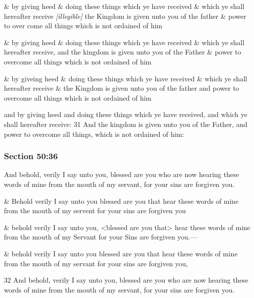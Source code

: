 		\begin{framed}
		\scriptsize
			\begin{compactdesc}
				\item[JSP] \& by giving heed \& doing these things which ye have received \& which ye shall hereafter receive \textit{[illegible]} the Kingdom is given unto you of the father \& power to over come all things which is not ordained of him
				\item[Gilbert] \& by giving heed \& doing these things which ye have received \& which ye shall hereafter receive, and the kingdom is given unto you of the Father \& power to overcome all things which is not ordained of him
				\item[Hyde and Smith] \& by giveing heed \& doing these things which ye have received \& which ye shall hereafter receive \& the Kingdom is given unto you of the father and power to overcome all things which is not ordained of him
				\item[BC] and by giving heed and doing these things which ye have received, and which ye shall hereafter receive: 31 And the kingdom is given unto you of the Father, and power to overcome all things, which is not ordained of him:
			\end{compactdesc}
		\end{framed}

	\subsubsection{Section 50:36} %
		\label{DC50-36}

		And behold, verily I say unto you, blessed are you who are now hearing these words of mine from the mouth of my servant, for your sins are forgiven you.

		\begin{framed}
		\scriptsize
			\begin{compactdesc}
				\item[JSP] \& Behold verily I say unto you blessed are you that hear these words of mine from the mouth of my servent for your sins are forgiven you
				\item[Gilbert] \& behold verily I say unto you, <blessed are you that> hear these words of mine from the mouth of my Servant for your Sins are forgiven you.---
				\item[Hyde and Smith] \& behold verily I say unto you blessed are you that hear these words of mine from the mouth of my servant for your sins are forgiven you,
				\item[BC] 32 And behold, verily I say unto you, blessed are you who are now hearing these words of mine from the mouth of my servant, for your sins are forgiven you.
			\end{compactdesc}
		\end{framed}


